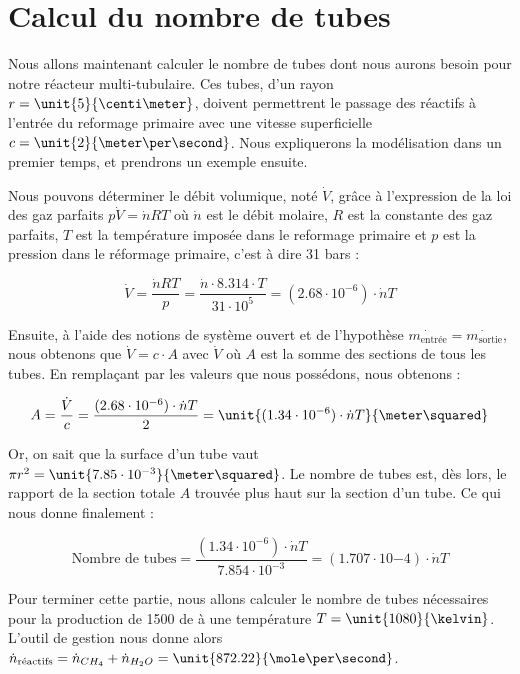 
\section{Calcul du nombre de tubes}
Nous allons maintenant calculer le nombre de tubes dont nous aurons besoin
pour notre réacteur multi-tubulaire. Ces tubes, d'un rayon $r = \unit{5}{\centi\meter}$,
doivent permettrent le passage des réactifs à l'entrée du reformage primaire avec une
vitesse superficielle $c = \unit{2}{\meter\per\second}$. 
Nous expliquerons la modélisation dans un premier temps, et prendrons un exemple ensuite.

Nous pouvons déterminer le débit volumique, noté $\dot{V}$, grâce à l'expression de la loi des gaz
parfaits $p\dot{V} = \dot{n}RT$ où $\dot{n}$ est le débit molaire, $R$ est la constante des gaz parfaits,
$T$ est la température imposée dans le reformage primaire et $p$ est la
pression dans le réformage primaire, c'est à dire 31 bars :

$$\dot{V} = \frac{\dot{n}RT}{p} = \frac{\dot{n}\cdot 8.314\cdot T}{31\cdot10^5}
 = (2.68\cdot10^{-6})\cdot \dot{n}T$$

Ensuite, à l'aide des notions de système ouvert et de l'hypothèse 
$\dot{m_{\text{entrée}}} = \dot{m_{\text{sortie}}}$, nous obtenons que $\dot{V} 
= c \cdot  A $ avec $ \dot{V}$ où $A$ est la somme des sections de tous les tubes.
En remplaçant par les valeurs que nous possédons, nous obtenons :

$$A = \frac{\dot{V}}{c} = \frac{(2.68\cdot10^{-6})\cdot \dot{n}T}{2} 
= \unit{(1.34\cdot10^{-6})\cdot \dot{n}T}{\meter\squared}$$

Or, on sait que la surface d'un tube vaut $\pi r^2
= \unit{7.85\cdot10^{-3}}{\meter\squared}$. Le nombre de tubes est,
dès lors, le rapport de la section totale $A$ trouvée plus haut sur
la section d'un tube. Ce qui nous donne finalement : 

$$\text{Nombre de tubes} = \frac{(1.34\cdot10^{-6})\cdot \dot{n}T}{7.854\cdot10^{-3}}
= (1.707\cdot10{-4})\cdot\dot{n}T$$

Pour terminer cette partie, nous allons calculer le nombre de tubes
nécessaires pour la production de \unit{1500}{\ton\per\dday} de 
à une température $T = \unit{1080}{\kelvin}$. L'outil de gestion
nous donne alors $\dot{n}_{\text{réactifs}} = \dot{n}_{CH_4} + \dot{n}_{H_2O} 
= \unit{872.22}{\mole\per\second}$.

